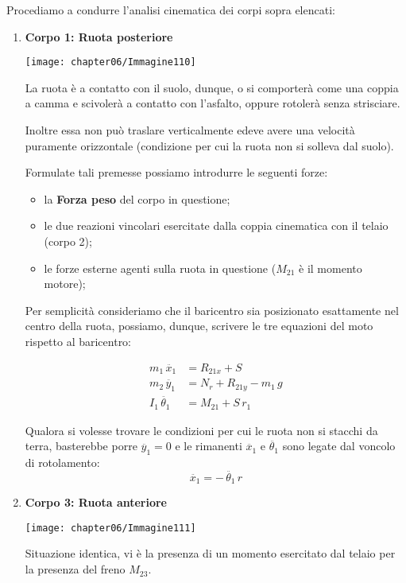 Procediamo a condurre l'analisi cinematica dei corpi sopra elencati:
\begin{enumerate}
\item \textbf{Corpo 1: Ruota posteriore}

\begin{minipage}{.35\textwidth}
\centering
\texttt{[image: chapter06/Immagine110]}
\end{minipage}
\hfill
\begin{minipage}{.65\textwidth}
La ruota è a contatto con il suolo, dunque, o si comporterà come una coppia a camma e scivolerà a contatto con l'asfalto, oppure rotolerà senza strisciare.

Inoltre essa non può traslare verticalmente edeve avere una velocità puramente orizzontale (condizione per cui la ruota non si solleva dal suolo).
\end{minipage}
\vspace{1mm}

Formulate tali premesse possiamo introdurre le seguenti forze:
\begin{itemize}
	\item la \textbf{Forza peso} del corpo in questione;
	\item le due reazioni vincolari esercitate dalla coppia cinematica con il telaio (corpo 2);
	\item le forze esterne agenti sulla ruota in questione ($M_{21}$ è il momento motore);
\end{itemize}

Per semplicità consideriamo che il baricentro sia posizionato esattamente nel centro della ruota, possiamo, dunque, scrivere le tre equazioni del moto rispetto al baricentro:

\begin{align*}
	m_1\,\ddot{x_1} &= R_{21x}+S\\
	m_2\,\ddot{y_1} &= N_r + R_{21y} - m_1\,g\\
	I_1\,\ddot{\theta_1} &= M_{21} + S\,r_1
\end{align*}

Qualora si volesse trovare le condizioni per cui le ruota non si stacchi da terra, basterebbe porre $\ddot{y_1} = 0$ e le rimanenti $\ddot{x_1}$ e $\ddot{\theta_1}$ sono legate dal voncolo di rotolamento:
\[\ddot{x_1} = -\,\ddot{\theta_1}\,r\]

\item \textbf{Corpo 3: Ruota anteriore}

\begin{minipage}{.35\textwidth}
\centering
\texttt{[image: chapter06/Immagine111]}
\end{minipage}
\hfill
\begin{minipage}{.65\textwidth}
Situazione identica, vi è la presenza di un momento esercitato dal telaio per la presenza del freno $M_{23}$.


\end{minipage}
\end{enumerate}
